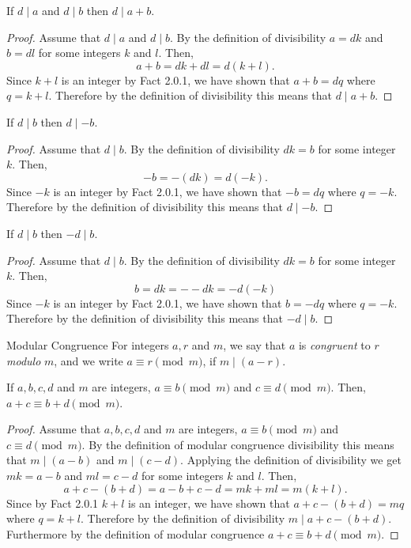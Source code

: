 \documentclass{report}
\begin{document}
\begin{proposition}{}{}
  If $d \mid a$ and $d \mid b$ then $d \mid a + b$.
\end{proposition}

\begin{proof}
  Assume that $d \mid a$ and $d \mid b$.
  By the definition of divisibility $a = dk$ and $b = dl$ for some integers $k$ and $l$.
  Then, $$a + b = dk + dl = d(k + l).$$
  Since $k + l$ is an integer by Fact 2.0.1, we have shown that $a + b = dq$ where $q = k + l$.
  Therefore by the definition of divisibility this means that $d \mid a + b$.
\end{proof}

\begin{proposition}{}{}
  If $d \mid b$ then $d \mid -b$.
\end{proposition}

\begin{proof}
  Assume that $d \mid b$.
  By the definition of divisibility $dk = b$ for some integer $k$.
  Then, $$-b = -(dk) = d(-k).$$
  Since $-k$ is an integer by Fact 2.0.1, we have shown that $-b = dq$ where $q = -k$.
  Therefore by the definition of divisibility this means that $d \mid -b$.
\end{proof}

\begin{proposition}{}{}
  If $d \mid b$ then $-d \mid b$.
\end{proposition}

\begin{proof}
  Assume that $d \mid b$.
  By the definition of divisibility $dk = b$ for some integer $k$.
  Then, $$b = dk = --dk = -d(-k)$$
  Since $-k$ is an integer by Fact 2.0.1, we have shown that $b = -dq$ where $q = -k$.
  Therefore by the definition of divisibility this means that $-d \mid b$.
\end{proof}

\begin{definition}{Modular Congruence}{}
  For integers $a, r$ and $m$, we say that $a$ is \emph{congruent} to $r$ \emph{modulo} $m$, and we write $a \equiv r \pmod{m}$, if $m \mid (a - r)$.
\end{definition}

\begin{proposition}{}{}
  If $a,b,c,d$ and $m$ are integers, $a \equiv b \pmod{m}$ and $c \equiv d \pmod{m}$. Then, $a + c \equiv b + d \pmod{m}$.
\end{proposition}

\begin{proof}
  Assume that $a,b,c,d$ and $m$ are integers, $a \equiv b \pmod{m}$ and $c \equiv d \pmod{m}$.
  By the definition of modular congruence divisibility this means that $m \mid (a - b)$ and $m \mid (c - d)$.
  Applying the definition of divisibility we get $mk = a - b$ and $ml = c - d$ for some integers $k$ and $l$.
  Then, $$a + c - (b + d) = a - b + c - d = mk + ml = m(k + l).$$
  Since by Fact 2.0.1 $k + l$ is an integer, we have shown that $a + c - (b + d) = mq$ where $q = k + l$.
  Therefore by the definition of divisibility $m \mid a + c - (b + d)$.
  Furthermore by the definition of modular congruence $a + c \equiv b + d \pmod{m}$.
\end{proof}
\end{document}

